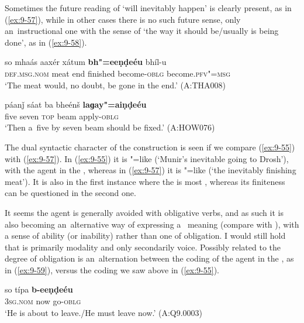 Sometimes the future reading of `will inevitably happen' is clearly present, as in (\ref{ex:9-57}), while in other cases there is no such future sense, only an~instructional one with the sense of `the way it should be/usually is being done', as in (\ref{ex:9-58}).

\begin{exe}
\ex
\label{ex:9-57}
\gll so mhaás aaxér xátum \textbf{bh"=eeṇḍeéu} bhíl-u \\
\textsc{def.msg.nom} meat end finished become-\textsc{oblg} become.\textsc{pfv"=msg}  \\
\glt `The meat would, no doubt, be gone in the end.' (A:THA008)

\ex
\label{ex:9-58}
\gll páanǰ sáat ba bheénš \textbf{laɡay"=aiṇḍeéu} \\
five seven \textsc{top} beam apply-\textsc{oblg} \\
\glt `Then a~five by seven beam should be fixed.' (A:HOW076)
\end{exe}

The dual syntactic character of the construction is seen if we compare (\ref{ex:9-55}) with (\ref{ex:9-57}). In (\ref{ex:9-55}) it is "=like (`Munir's inevitable going to Drosh'), with the agent in the , whereas in (\ref{ex:9-57}) it is "=like (`the inevitably finishing meat'). It is also in the first instance where the  is most , whereas its finiteness can be questioned in the second one.


It seems the agent is generally avoided with obligative  verbs, and as such it is also becoming an~alternative way of expressing a~ meaning (compare with ), with a sense of ability (or inability) rather than one of obligation. I would still hold that  is primarily modality and only secondarily voice. Possibly related to the degree of obligation is an~alternation between the coding of the agent in the , as in (\ref{ex:9-59}), versus the  coding we saw above in (\ref{ex:9-55}).

\begin{exe}
\ex
\label{ex:9-59}
\gll so típa \textbf{b-eeṇḍeéu} \\
\textsc{3sg.nom} now go-\textsc{oblg} \\
\glt `He is about to leave./He must leave now.' (A:Q9.0003)
\end{exe}

